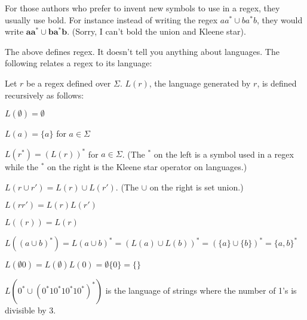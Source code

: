 



\newpage
For those authors who prefer to invent new symbols to use in a
regex, they usually use bold. For instance instead of writing the
regex $aa^* \cup ba^*b$, they would write $\mathbf{ aa^* \cup
ba^*b}$. (Sorry, I can't bold the union and Kleene star).


The above defines regex.
It doesn't tell you anything about languages.
The following relates a regex to its language:

\begin{defn}
 Let $r$ be a regex defined over $\Sigma$. 
 $L(r)$, the language generated by $r$, is defined recursively as follows:
 \begin{tightlist}
  \item $L(\emptyset) = \emptyset$
  \item $L(a) = \{a\}$ for $a \in \Sigma$
  \item $L(r^*) = (L(r))^*$ for $a \in \Sigma$. (The ${}^*$ on the left
        is a symbol used in a regex while the ${}^*$ on the right is the 
        Kleene star operator on languages.)
  \item $L(r \cup r') = L(r) \cup L(r')$. (The $\cup$ on the right is
        set union.)
  \item $L(rr') = L(r)L(r')$
  \item $L((r)) = L(r)$
 \end{tightlist}
\end{defn}

\begin{eg}
  \mbox{}
  \begin{tightlist}
  \item $L((a \cup b)^*) = L(a \cup b)^* = (L(a) \cup L(b))^* = (\{a\} \cup
    \{b\})^* = \{a,b\}^*$
  \item $L(\emptyset 0) = L(\emptyset) L(0) = \emptyset  \{0\} = \{\}$
  \item $L( 0^* \cup (0^*10^*10^*10^*)^*)$ is the language of strings
    where the number of 1's is divisible by 3.
  \end{tightlist}
  \end{eg}


